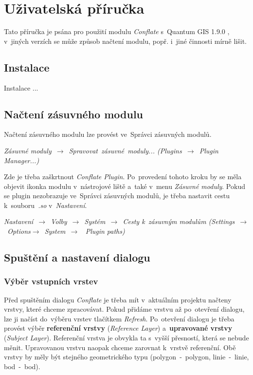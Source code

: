 \chapter{Uživatelská příručka}
\label{priloha-prirucka}

Tato příručka je psána pro použití modulu \textit{Conflate} s~Quantum GIS 1.9.0 , 
v~jiných verzích se může způsob načtení modulu, popř. i~jiné činnosti mírně lišit.

\section{Instalace}
\label{prirucka-instalace}
Instalace ... %

\section{Načtení zásuvného modulu}
\label{prirucka-nacteni}

Načtení zásuvného modulu lze provést ve~Správci zásuvných modulů.
\begin{center}
\textit{Zásuvné moduly~$\rightarrow$~Spravovat~zásuvné~moduly... 
(Plugins~$\rightarrow$~Plugin Manager...)}
\end{center}
Zde je třeba zaškrtnout \textit{Conflate Plugin}. Po~provedení tohoto kroku by se 
měla objevit ikonka modulu v~nástrojové liště a~také v~menu \textit{Zásuvné moduly}. 
Pokud se plugin nezobrazuje ve~Správci zásuvných modulů, je třeba nastavit cestu 
k~souboru~\textit{.so} v~\textit{Nastavení}.
\begin{center} 
\textit{Nastavení~$\rightarrow$~Volby~$\rightarrow$~Systém~$\rightarrow$~Cesty 
k~zásuvným modulům (Settings~$\rightarrow$~Options$\rightarrow$~System~$\rightarrow$
~Plugin paths)}
\end{center}


\section{Spuštění a nastavení dialogu}
\label{prirucka-spusteni}

\subsection{Výběr vstupních vrstev}
Před spuštěním dialogu \textit{Conflate} je třeba mít v~aktuálním projektu 
načteny vrstvy, které chceme zpracovávat. Pokud přidáme vrstvu až po~otevření
dialogu, lze ji načíst do~výběru vrstev tlačítkem \textit{Refresh}.
Po~otevření dialogu je třeba provést výběr \textbf{re\-ferenční vrstvy} 
(\textit{Reference Layer}) a~\textbf{upravované vrstvy} (\textit{Subject Layer}). 
Re\-ferenční vrstva je obvykla ta s~vyšší přesností, která se nebude měnit. 
Upravovanou vrstvu naopak chceme zarovnat k~vrstvě referenční. 
Obě vrstvy by měly být stejného geometrického typu (polygon~-~polygon, 
linie~-~linie, bod~-~bod).


